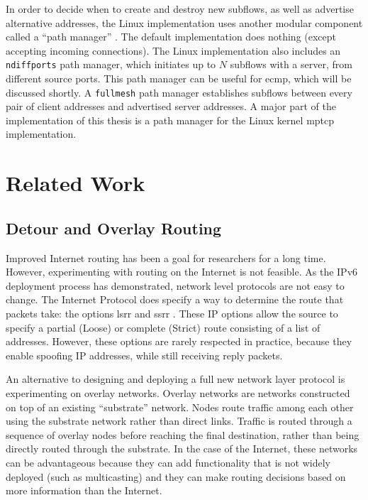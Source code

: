 \documentclass{cwru}
\begin{document}
In order to decide when to create and destroy new subflows, as well as advertise
alternative addresses, the Linux implementation uses another modular component
called a ``path manager'' \cite{mptcp}. The default implementation does nothing
(except accepting incoming connections). The Linux implementation also includes
an \texttt{ndiffports} path manager, which initiates up to $N$ subflows with a
server, from different source ports. This path manager can be useful for
\ac{ecmp}, which will be discussed shortly. A \texttt{fullmesh} path manager
establishes subflows between every pair of client addresses and advertised
server addresses. A major part of the implementation of this thesis is a path
manager for the Linux kernel \ac{mptcp} implementation.



\chapter{Related Work}
\label{c:rw}

\section{Detour and Overlay Routing}

Improved Internet routing has been a goal for researchers for a long time.
However, experimenting with routing on the Internet is not feasible. As the IPv6
deployment process has demonstrated, network level protocols are not easy to
change. The Internet Protocol does specify a way to determine the route that
packets take: the options \ac{lsrr} and \ac{ssrr} \cite{rfc791}. These IP
options allow the source to specify a partial (Loose) or complete (Strict) route
consisting of a list of addresses. However, these options are rarely respected
in practice, because they enable spoofing IP addresses, while still receiving
reply packets.

An alternative to designing and deploying a full new network layer protocol is
experimenting on overlay networks. Overlay networks are networks constructed on
top of an existing ``substrate'' network. Nodes route traffic among each other
using the substrate network rather than direct links. Traffic is routed through
a sequence of overlay nodes before reaching the final destination, rather than
being directly routed through the substrate. In the case of the Internet, these
networks can be advantageous because they can add functionality that is not
widely deployed (such as multicasting) and they can make routing decisions based
on more information than the Internet.
\end{document}

